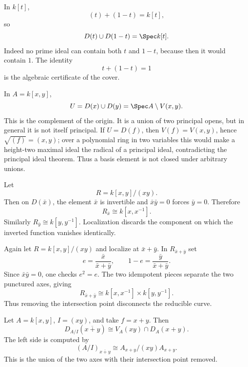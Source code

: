 \begin{example}
In $k[t]$,
\[
(t)+(1-t)=k[t],
\]
so
\[
D(t)\cup D(1-t)=\Spec k[t].
\]
Indeed no prime ideal can contain both $t$ and $1-t$, because then it would contain $1$.
The identity
\[
t+(1-t)=1
\]
is the algebraic certificate of the cover.
\end{example}

\begin{example}
In $A=k[x,y]$,
\[
U=D(x)\cup D(y)=\Spec A\setminus V(x,y).
\]
This is the complement of the origin.  It is a union of two principal opens, but in general
it is not itself principal.  If $U=D(f)$, then $V(f)=V(x,y)$, hence
$\sqrt{(f)}=(x,y)$; over a polynomial ring in two variables this would make a height-two
maximal ideal the radical of a principal ideal, contradicting the principal ideal theorem.
Thus a basis element is not closed under arbitrary unions.
\end{example}

\begin{example}
Let
\[
R=k[x,y]/(xy).
\]
Then on $D(\bar x)$, the element $\bar x$ is invertible and
$\bar x\bar y=0$ forces $\bar y=0$.  Therefore
\[
R_{\bar x}\cong k[x,x^{-1}].
\]
Similarly $R_{\bar y}\cong k[y,y^{-1}]$.  Localization discards the component on which the
inverted function vanishes identically.
\end{example}

\begin{example}
Again let $R=k[x,y]/(xy)$ and localize at $\bar x+\bar y$.  In $R_{\bar x+\bar y}$ set
\[
e=\frac{\bar x}{\bar x+\bar y},
\qquad
1-e=\frac{\bar y}{\bar x+\bar y}.
\]
Since $\bar x\bar y=0$, one checks $e^2=e$.  The two idempotent pieces separate the two
punctured axes, giving
\[
R_{\bar x+\bar y}\cong k[x,x^{-1}]\times k[y,y^{-1}].
\]
Thus removing the intersection point disconnects the reducible curve.
\end{example}

\begin{example}
Let $A=k[x,y]$, $I=(xy)$, and take $f=x+y$.  Then
\[
D_{A/I}(\overline{x+y})
\cong
V_A(xy)\cap D_A(x+y).
\]
The left side is computed by
\[
(A/I)_{\overline{x+y}}\cong A_{x+y}/(xy)A_{x+y}.
\]
This is the union of the two axes with their intersection point removed.
\end{example}

